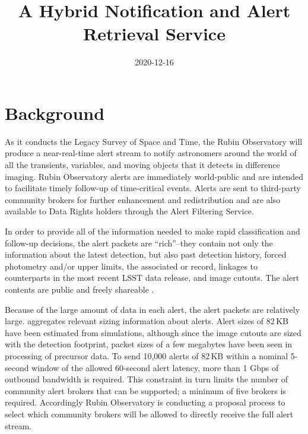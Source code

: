 \documentclass[DM,authoryear,toc]{lsstdoc}
\title{A Hybrid Notification and Alert Retrieval Service}
\date{2020-12-16}
\begin{document}
\maketitle


\section{Background}

As it conducts the Legacy Survey of Space and Time, the Rubin Observatory will produce a near-real-time alert stream to notify astronomers around the world of all the transients, variables, and moving objects that it detects in difference imaging.
Rubin Observatory alerts are immediately world-public and are intended to facilitate timely follow-up of time-critical events.
Alerts are sent to third-party community brokers for further enhancement and redistribution and are also available to Data Rights holders through the Alert Filtering Service.

In order to provide all of the information needed to make rapid classification and follow-up decisions, the alert packets are ``rich''--they contain not only the information about the latest detection, but also past detection history, forced photometry and/or upper limits, the associated \DIAObject or \SSObject record, linkages to counterparts in the most recent LSST data release, and image cutouts.
The alert contents are public and freely shareable .

Because of the large amount of data in each alert, the alert packets are relatively large.
 aggregates relevant sizing information about alerts.
Alert sizes of 82\,KB have been estimated from simulations, although since the image cutouts are sized with the detection footprint, packet sizes of a few megabytes have been seen in processing of precursor data.
To send 10,000 alerts of 82\,KB within a nominal 5-second window of the allowed 60-second alert latency, more than 1 Gbps of outbound bandwidth is required.
This constraint in turn limits the number of community alert brokers that can be supported; a minimum of five brokers is required.
Accordingly Rubin Observatory is conducting a proposal process to select which community brokers will be allowed to directly receive the full alert stream.
\end{document}

